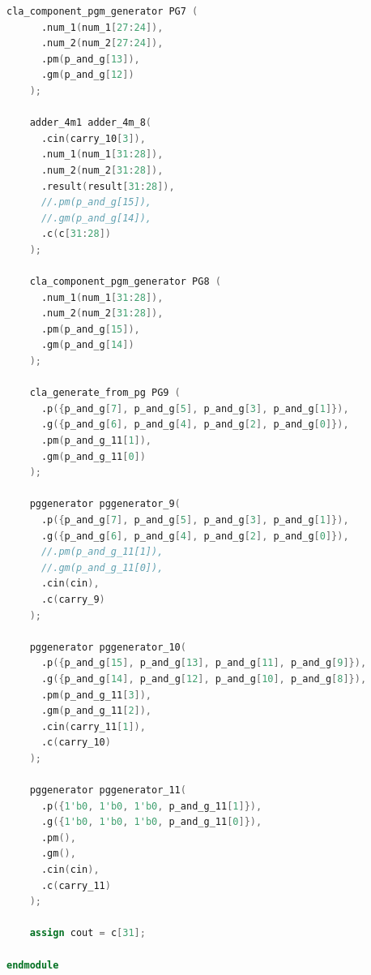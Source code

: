 \documentclass[zihao=5, UTF8]{article}
\theoremstyle{MyLineTheoremStyle} %
\theoremstyle{MyBlockTheoremStyle} %
\theoremstyle{MySubsubsectionStyle} %
\begin{document}
\begin{lstlisting}[language=Verilog]
    cla_component_pgm_generator PG7 (
      .num_1(num_1[27:24]),
      .num_2(num_2[27:24]),
      .pm(p_and_g[13]),
      .gm(p_and_g[12])
    );

    adder_4m1 adder_4m_8(
      .cin(carry_10[3]),
      .num_1(num_1[31:28]),
      .num_2(num_2[31:28]),
      .result(result[31:28]),
      //.pm(p_and_g[15]),
      //.gm(p_and_g[14]),
      .c(c[31:28])
    );

    cla_component_pgm_generator PG8 (
      .num_1(num_1[31:28]),
      .num_2(num_2[31:28]),
      .pm(p_and_g[15]),
      .gm(p_and_g[14])
    );

    cla_generate_from_pg PG9 (
      .p({p_and_g[7], p_and_g[5], p_and_g[3], p_and_g[1]}),
      .g({p_and_g[6], p_and_g[4], p_and_g[2], p_and_g[0]}),
      .pm(p_and_g_11[1]),
      .gm(p_and_g_11[0])
    );

    pggenerator pggenerator_9(
      .p({p_and_g[7], p_and_g[5], p_and_g[3], p_and_g[1]}),
      .g({p_and_g[6], p_and_g[4], p_and_g[2], p_and_g[0]}),
      //.pm(p_and_g_11[1]),
      //.gm(p_and_g_11[0]),
      .cin(cin),
      .c(carry_9)
    );

    pggenerator pggenerator_10(
      .p({p_and_g[15], p_and_g[13], p_and_g[11], p_and_g[9]}),
      .g({p_and_g[14], p_and_g[12], p_and_g[10], p_and_g[8]}),
      .pm(p_and_g_11[3]),
      .gm(p_and_g_11[2]),
      .cin(carry_11[1]),
      .c(carry_10)
    );

    pggenerator pggenerator_11(
      .p({1'b0, 1'b0, 1'b0, p_and_g_11[1]}),
      .g({1'b0, 1'b0, 1'b0, p_and_g_11[0]}),
      .pm(),
      .gm(),
      .cin(cin),
      .c(carry_11)
    );

    assign cout = c[31];

endmodule

\end{lstlisting}
\end{document}
